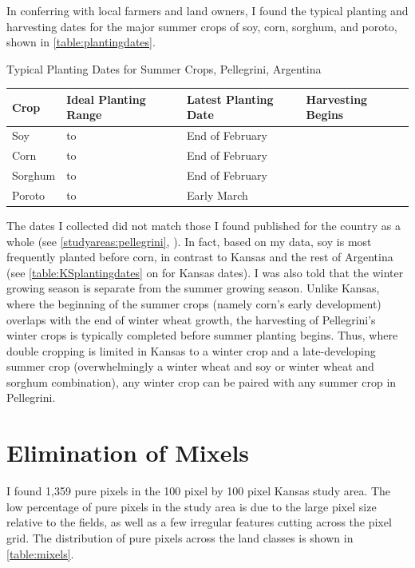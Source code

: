 In conferring with local farmers and land owners, I found the typical planting and harvesting dates for the major summer crops of soy, corn, sorghum, and poroto, shown in \autoref{table:plantingdates}.
\begin{sstable}
  \centering
  \caption{Typical Planting Dates for Summer Crops, Pellegrini, Argentina}
  \label{table:plantingdates}
  \begin{tabu}{X[0.45,m,c]X[1,m,c]X[.95,m,c]X[0.5,m,c]}
    \toprule
    \textbf{Crop} & \textbf{Ideal Planting Range} & \textbf{Latest Planting Date} & \textbf{Harvesting Begins} \\
    \midrule
    Soy &  to  & End of February &  \\
    Corn &  to  & End of February &  \\
    Sorghum &  to  & End of February &  \\
    Poroto &  to  & Early March &  \\
    \bottomrule
  \end{tabu}
\end{sstable}
The dates I collected did not match those I found published for the country as a whole (see \autoref{studyareas:pellegrini}, ). In fact, based on my data, soy is most frequently planted before corn, in contrast to Kansas and the rest of Argentina (see \autoref{table:KSplantingdates} on  for Kansas dates). I was also told that the winter growing season is separate from the summer growing season. Unlike Kansas, where the beginning of the summer crops (namely corn's early development) overlaps with the end of winter wheat growth, the harvesting of Pellegrini's winter crops is typically completed before summer planting begins. Thus, where double cropping is limited in Kansas to a winter crop and a late-developing summer crop (overwhelmingly a winter wheat and soy or winter wheat and sorghum combination), any winter crop can be paired with any summer crop in Pellegrini.


\section{Elimination of Mixels}

I found 1,359 pure pixels in the 100 pixel by 100 pixel Kansas study area. The low percentage of pure pixels in the study area is due to the large pixel size relative to the fields, as well as a few irregular features cutting across the pixel grid. The distribution of pure pixels across the land classes is shown in \autoref{table:mixels}.

